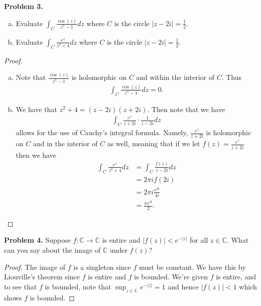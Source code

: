 \documentclass[leqno]{article}
\theoremstyle{nonumberplain}
\newtheorem{proof}{Proof}
\newcommand{\C}{\mathbb{C}}
\begin{document}
\vspace*{1cm}

\noindent\textbf{Problem 3.} ~
\begin{enumerate}[(a)]
\item Evaluate $\int_C \frac{\cos(z)}{z^5-1}dz$ where $C$ is the circle $|z-2i|=\frac{1}{2}$.
\item Evaluate $\int_C \frac{e^z}{z^2+4}dz$ where $C$ is the circle $|z-2i|=\frac{1}{2}$.
\end{enumerate}

\begin{proof}
\begin{enumerate}[(a)]
\item Note that $\displaystyle{\frac{\cos(z)}{z^5-1}}$ is holomorphic on $C$ and within the interior of $C$. Thus 
\begin{align*}
\int_C\frac{\cos(z)}{z^5-1}dz = 0.
\end{align*}
\item We have that $z^2+4=(z-2i)(z+2i)$.  Then note that we have
\begin{align*}
\int_C \frac{e^z}{z+2i}\cdot \frac{1}{z-2i} dz
\end{align*}
allows for the use of Cauchy's integral formula.  Namely, $\displaystyle{\frac{e^z}{z+2i}}$ is holomorphic on $C$ and in the interior of $C$ as well, meaning that if we let $\displaystyle{f(z)=\frac{e^z}{z+2i}}$ then we have
\begin{align*}
\int_C \frac{e^z}{z^2+4}dz &= \int_C \frac{f(z)}{z-2i}dz\\
&= 2\pi i f(2i)\\
&= 2\pi i \frac{e^{2i}}{4i}\\
&=\frac{\pi e^{2i}}{2}.
\end{align*}
\end{enumerate}
\end{proof}

\vspace*{1cm}

\noindent\textbf{Problem 4.} Suppose $f\colon \C \to \C$ is entire and $|f(z)|<e^{-|z|}$ for all $z\in \C$. What can you say about the image of $\C$ under $f(z)$?


\begin{proof}
The image of $f$ is a singleton since $f$ must be constant.  We have this by Liouville's theorem since $f$ is entire and $f$ is bounded. We're given $f$ is entire, and to see that $f$ is bounded, note that $\sup_{z\in \C} e^{-|z|}=1$ and hence $|f(z)|<1$ which shows $f$ is bounded.
\end{proof}
\end{document}
